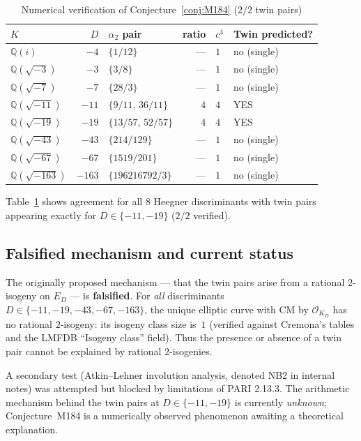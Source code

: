\documentclass[12pt]{amsart}
\theoremstyle{definition}
\newcommand{\Q}{\mathbb{Q}}
\newcommand{\OK}{\mathcal{O}_K}
\begin{document}
\begin{table}[h]
  \caption{Numerical verification of Conjecture~\ref{conj:M184} ($2/2$ twin pairs)}
  \label{tab:M184}
  \renewcommand{\arraystretch}{1.25}
  \begin{tabular}{lrlrll}
    \toprule
    $K$ & $D$ & $\alpha_2$ pair & ratio & $c^4$ & Twin predicted? \\
    \midrule
    $\Q(i)$          & $-4$   & $\{1/12\}$         & ---   & $1$   & no (single) \\
    $\Q(\sqrt{-3})$  & $-3$   & $\{3/8\}$          & ---   & $1$   & no (single) \\
    $\Q(\sqrt{-7})$  & $-7$   & $\{28/3\}$         & ---   & $1$   & no (single) \\
    $\Q(\sqrt{-11})$ & $-11$  & $\{9/11,\,36/11\}$ & $4$   & $4$   & YES \\
    $\Q(\sqrt{-19})$ & $-19$  & $\{13/57,\,52/57\}$& $4$   & $4$   & YES \\
    $\Q(\sqrt{-43})$ & $-43$  & $\{214/129\}$      & ---   & $1$   & no (single) \\
    $\Q(\sqrt{-67})$ & $-67$  & $\{1519/201\}$     & ---   & $1$   & no (single) \\
    $\Q(\sqrt{-163})$& $-163$ & $\{196216792/3\}$  & ---   & $1$   & no (single) \\
    \bottomrule
  \end{tabular}
\end{table}

Table~\ref{tab:M184} shows agreement for all $8$ Heegner discriminants
with twin pairs appearing exactly for $D \in \{-11, -19\}$ ($2/2$ verified).

\subsection{Falsified mechanism and current status}

The originally proposed mechanism --- that the twin pairs arise from a rational
$2$-isogeny on $E_D$ --- is \textbf{falsified}.
For \emph{all} discriminants $D \in \{-11, -19, -43, -67, -163\}$,
the unique elliptic curve with CM by $\OK_D$ has no rational
$2$-isogeny: its isogeny class size is~$1$ (verified against Cremona's tables
and the LMFDB ``Isogeny class'' field).
Thus the presence or absence of a twin pair cannot be explained by rational
$2$-isogenies.

A secondary test (Atkin--Lehner involution analysis, denoted NB2 in internal
notes) was attempted but blocked by limitations of PARI 2.13.3.
The arithmetic mechanism behind the twin pairs at $D \in \{-11,-19\}$ is
currently \emph{unknown}; Conjecture~M184 is a numerically observed
phenomenon awaiting a theoretical explanation.
\end{document}
